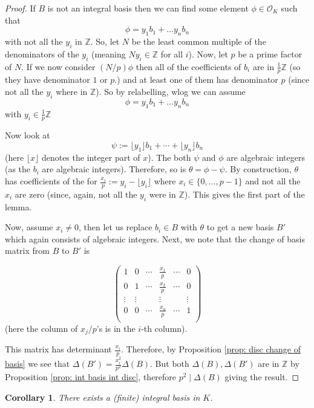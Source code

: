 \documentclass[11pt,a4paper]{report}
\theoremstyle{plain}
\newtheorem{corollary}[subsection]{Corollary}
\theoremstyle{definition}
\theoremstyle{definition}
\newcommand{\ZZ}{\mathbb{Z}}
\def \OO {\mathcal{O}}
\begin{document}
	\begin{proof}
		If $B$ is not an integral basis then we can find some element $\phi \in \OO_K$ such that \[\phi=y_1b_1+\dots y_nb_n\] with not all the $y_i$ in $\ZZ$. So, let $N$ be the least common multiple of the denominators of the $y_i$ (meaning $Ny_i \in \ZZ$ for all $i$). Now, let $p$ be a prime factor of $N$. If we now consider $(N/p)\phi$ then all of the coefficients of $b_i$ are in $\frac{1}{p} \ZZ$ (so they have denominator $1$ or $p$.) and at least one of them has denominator $p$ (since not all the $y_i$ where in $\ZZ$). So by relabelling, wlog we can assume \[\phi=y_1b_1+\dots y_nb_n\] with $y_i \in  \frac{1}{p} \ZZ$
		
		Now look at \[\psi:=\lfloor y_1 \rfloor b_1+\cdots+\lfloor y_n \rfloor b_n\] (here $\lfloor x \rfloor$ denotes the integer part of $x$). The both $\psi$ and $\phi$ are algebraic integers (as the $b_i$ are algebraic integers). Therefore, so is $\theta=\phi-\psi$. By construction, $\theta$ has coefficients of the for $\frac{x_i}{p}:=y_i-\lfloor y_i \rfloor$ where $x_i \in \{0,\dots,p-1\}$ and not all the $x_i$ are zero (since, again, not all the $y_i$ were in $\ZZ$). This gives the first part of the lemma.
		
		Now, assume $x_i \neq 0$, then let us replace $b_i \in B$ with $\theta$ to get a new basis $B'$ which again consists of algebraic integers. Next, we note that the change of basis matrix from $B$ to $B'$ is 
		
		\[ \left( \begin{matrix}
			1&0&\cdots& \frac{x_1}{p}& \cdots &0 \\
			0&1&\cdots& \frac{x_2}{p}& \cdots &0 \\
			\vdots& \vdots&&\vdots&&\vdots \\
			0&0&\cdots& \frac{x_n}{p}& \cdots &1 \\
		\end{matrix}                          \right) \](here the column of $x_j/p$'s is in the $i$-th column).
		
		This matrix has determinant $\frac{x_i}{p}.$ Therefore, by 	Proposition \ref{prop: disc change of basis} we see that $\Delta(B')=\frac{x_i^2}{p^2}\Delta(B)$. But both $\Delta(B),\Delta(B')$ are  in $\ZZ$ by Proposition \ref{prop: int basis int disc}, therefore $p^2 \mid \Delta(B)$ giving the result.
	\end{proof}
	
	\begin{corollary}\label{cor: int basis exists}
		There exists a (finite) integral basis in $K$. 
	\end{corollary}
	
\end{document}
